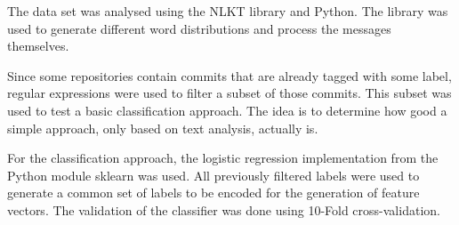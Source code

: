 The data set was analysed using the NLKT library \cite{nltk} and Python.
The library was used to generate different word distributions and process
the messages themselves.

Since some repositories contain commits that are already tagged with some label,
regular expressions were used to filter a subset of those commits.
This subset was used to test a basic classification approach. The idea is to
determine how good a simple approach, only based on text analysis, actually is.

For the classification approach, the logistic regression implementation from
the Python module sklearn \cite{sklearn} was used. All previously filtered
labels were used to generate a common set of labels to be encoded for the
generation of feature vectors. The validation of the classifier was done using
10-Fold cross-validation.
